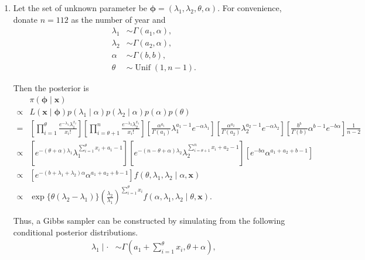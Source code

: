 \documentclass[11pt]{article}
\begin{document}
\begin{enumerate}
    \item Let the set of unknown parameter be $\mathbf{\phi}=(\lambda_1,\lambda_2,\theta,\alpha)$. For convenience, donate $n=112$ as the number of year and
    \begin{align*}
        \lambda_1 &\sim \Gamma(a_1,\alpha),\\
        \lambda_2 &\sim \Gamma(a_2,\alpha),\\
        \alpha &\sim \Gamma(b,b),\\
        \theta&\sim \operatorname{Unif}(1,n-1).
    \end{align*}
    \par Then the posterior is
    \begin{align*}
        &\pi(\mathbf{\phi} \mid \mathbf{x})\\
        \propto& L( \mathbf{x}\mid \mathbf{\phi}) p(\lambda_1\mid\alpha) p(\lambda_2\mid\alpha) p(\alpha) p(\theta)\\
        =&\left[\prod_{i=1}^{\theta} \frac{e^{-\lambda_1} \lambda_1^{x_{i}}}{x_{i} !}\right] \left[\prod_{i=\theta+1}^{n} \frac{e^{-\lambda_2} \lambda_2^{x_{i}}}{x_{i} !}\right]
        \left[\frac{\alpha^{a_1}}{\Gamma(a_1)} \lambda_1^{a_1-1} e^{-\alpha \lambda_1}\right]
        \left[\frac{\alpha^{a_2}}{\Gamma(a_2)} \lambda_2^{a_2-1} e^{-\alpha \lambda_2}\right]
        \left[\frac{b^{b}}{\Gamma(b)} \alpha^{b-1} e^{-b \alpha}\right]
        \frac{1}{n-2}\\
        \propto&\left[ e^{-(\theta+\alpha)\lambda_1} \lambda_1^{\sum\limits_{i=1}^{\theta} x_i+a_1-1} \right]
        \left[ e^{-(n-\theta+\alpha)\lambda_2} \lambda_2^{\sum\limits_{i=\theta+1}^{n} x_i+a_2-1} \right] \left[ e^{-b\alpha} \alpha^{a_1+a_2+b-1} \right]\\ 
        \propto& \left[ e^{-(b+\lambda_1+\lambda_2)\alpha} \alpha^{a_1+a_2+b-1} \right] f(\theta,\lambda_1,\lambda_2\mid \alpha,\mathbf{x})\\ 
        \propto& \exp\{\theta(\lambda_2-\lambda_1)\}\left( \frac{\lambda_2}{\lambda_1}\right)^{\sum\limits_{i=1}^{\theta} x_i} f(\alpha,\lambda_1,\lambda_2\mid \theta,\mathbf{x}).
    \end{align*}
    \par Thus, a Gibbs sampler can be constructed by simulating from the following conditional posterior distributions. 
    \begin{align*}
        \lambda_1 \mid \cdot &\sim \Gamma(a_1+\sum\limits_{i=1}^{\theta}x_i, \theta+\alpha),\\

\end{align*}
\end{enumerate}
\end{document}
